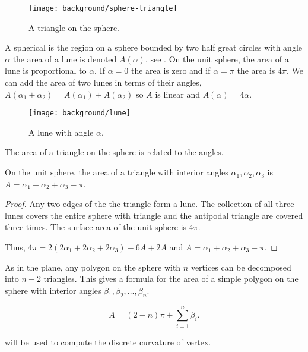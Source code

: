 \begin{figure}[htb]
\centering
\texttt{[image: background/sphere-triangle]}
\caption{A triangle on the sphere.}
\label{fig:sphere-triangle}
\end{figure}
A spherical  is the region on a sphere bounded by two half great circles
with angle $\alpha$ the area of a lune is denoted $A(\alpha)$,
 see .
On the unit sphere, the area of a lune is proportional to $\alpha$. 
If $\alpha=0$ the area is zero and if $\alpha=\pi$ the area is $4\pi$.
We can add the area of two lunes in terms of their angles, 
$A(\alpha_1+\alpha_2)=A(\alpha_1)+A(\alpha_2)$ so $A$ is linear
and  $A(\alpha)=4\alpha.$


\begin{figure}[htb]
\centering
\texttt{[image: background/lune]}
\caption{A lune with angle $\alpha$.}
\label{fig:lune}
\end{figure}

The area of a triangle on the sphere is related to the angles.

\begin{lemma}\label{lem:spherical-triangle}
On the unit sphere, the area of a triangle with interior angles $\alpha_1, \alpha_2, \alpha_3$
is $A=\alpha_1+\alpha_2+\alpha_3-\pi$.
\end{lemma}

\begin{proof}
Any two edges of the the triangle form a lune. The collection of 
all three lunes covers the entire sphere with triangle and the antipodal triangle
are covered three times. The surface area of the unit sphere is $4\pi$.

Thus, $4\pi=2(2\alpha_1+2\alpha_2+2\alpha_3)-6A+2A$
and $A=\alpha_1+\alpha_2+\alpha_3-\pi$.
\end{proof}

As in the plane, any polygon on the sphere with $n$ vertices can be decomposed
into $n-2$ triangles. This gives a formula for the area of a simple polygon
on the sphere with interior angles $\beta_1,\beta_2,\ldots, \beta_n$.

\begin{equation} \label{eqn:sphere-area}
A=(2-n)\pi +\sum_{i=1}^n \beta_i.
\end{equation}

 will be used to compute
the discrete curvature of vertex.



